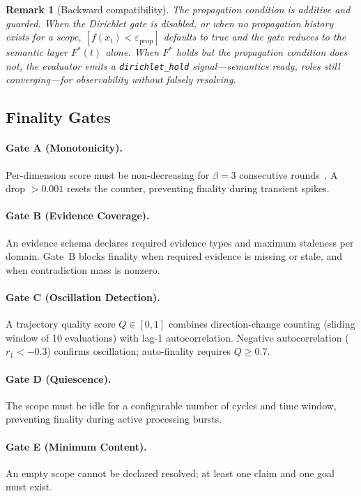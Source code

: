 \documentclass[11pt]{article}
\newtheorem{remark}{Remark}
\begin{document}
\begin{remark}[Backward compatibility]
The propagation condition is additive and guarded. When the Dirichlet gate is disabled, or when no propagation history exists for a scope, $[f(x_t) < \varepsilon_{\mathrm{prop}}]$ defaults to true and the gate reduces to the semantic layer $F^*(t)$ alone. When $F^*$ holds but the propagation condition does not, the evaluator emits a \texttt{dirichlet\_hold} signal---semantics ready, roles still converging---for observability without falsely resolving.
\end{remark}

\subsection{Finality Gates}

\paragraph{Gate A (Monotonicity).}
Per-dimension score must be non-decreasing for $\beta = 3$ consecutive rounds~\cite{ruan2025}.
A drop $> 0.001$ resets the counter, preventing finality during transient spikes.

\paragraph{Gate B (Evidence Coverage).}
An evidence schema declares required evidence types and maximum staleness per domain.
Gate~B blocks finality when required evidence is missing or stale, and when contradiction mass is nonzero.

\paragraph{Gate C (Oscillation Detection).}
A trajectory quality score $Q \in [0,1]$ combines direction-change counting (sliding window of 10 evaluations) with lag-1 autocorrelation.
Negative autocorrelation ($r_1 < -0.3$) confirms oscillation; auto-finality requires $Q \geq 0.7$.

\paragraph{Gate D (Quiescence).}
The scope must be idle for a configurable number of cycles and time window, preventing finality during active processing bursts.

\paragraph{Gate E (Minimum Content).}
An empty scope cannot be declared resolved; at least one claim and one goal must exist.
\end{document}
